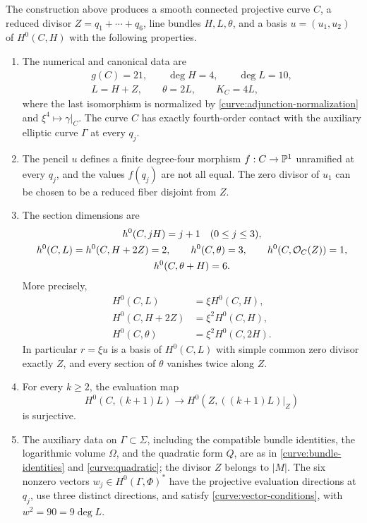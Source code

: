 \begin{proposition}\label{prop:curve-data}
The construction above produces a smooth connected projective curve
$C$, a reduced divisor $Z=q_1+\cdots+q_6$, line bundles $H,L,\theta$,
and a basis $u=(u_1,u_2)$ of $H^0(C,H)$ with the following properties.
\begin{enumerate}
\item The numerical and canonical data are
\[
 \begin{gathered}
 g(C)=21,\qquad \deg H=4,\qquad\deg L=10,\\
 L=H+Z,\qquad\theta=2L,\qquad K_C=4L,
 \end{gathered}
\]
where the last isomorphism is normalized by
\eqref{curve:adjunction-normalization} and $\xi^4\mapsto\gamma|_C$.
The curve $C$ has exactly fourth-order contact with the auxiliary
elliptic curve $\Gamma$ at every $q_j$.
\item The pencil $u$ defines a finite degree-four morphism
$f:C\to\mathbb P^1$ unramified at every $q_j$, and the values $f(q_j)$ are
not all equal.  The zero divisor of $u_1$ can be chosen to be a reduced
fiber disjoint from $Z$.
\item The section dimensions are
\begin{equation}\label{curve:section-dimensions}
\begin{gathered}
 h^0(C,jH)=j+1\quad(0\le j\le3),\\
 h^0(C,L)=h^0(C,H+2Z)=2,\qquad
 h^0(C,\theta)=3,\qquad h^0(C,\mathcal O_C(Z))=1,\\
 h^0(C,\theta+H)=6.
\end{gathered}
\end{equation}
More precisely,
\begin{equation}\label{curve:section-multiplication}
\begin{split}
 H^0(C,L)&=\xi H^0(C,H),\\
 H^0(C,H+2Z)&=\xi^2H^0(C,H),\\
 H^0(C,\theta)&=\xi^2H^0(C,2H).
\end{split}
\end{equation}
In particular $r=\xi u$ is a basis of $H^0(C,L)$ with simple common
zero divisor exactly $Z$, and every section of $\theta$ vanishes
twice along $Z$.
\item For every $k\ge2$, the evaluation map
\begin{equation}\label{curve:evaluation-surjectivity}
 H^0(C,(k+1)L)\longrightarrow H^0(Z,((k+1)L)|_Z)
\end{equation}
is surjective.
\item The auxiliary data on $\Gamma\subset\Sigma$, including the
compatible bundle identities, the logarithmic volume $\Omega$, and
the quadratic form $Q$, are as in \eqref{curve:bundle-identities} and
\eqref{curve:quadratic}; the divisor $Z$ belongs to $|M|$.
The six nonzero vectors $w_j\in H^0(\Gamma,\Phi)^*$ have the
projective evaluation directions at $q_j$, use three distinct
directions, and satisfy \eqref{curve:vector-conditions}, with
$w^2=90=9\deg L$.
\end{enumerate}
\end{proposition}

